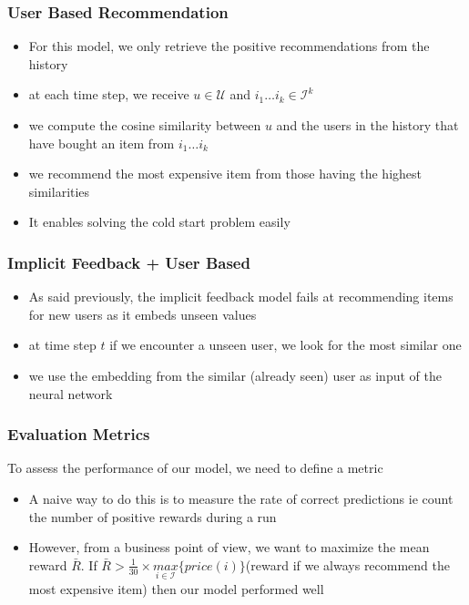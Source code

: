 \documentclass{beamer}
\begin{document}
\begin{frame}
	\frametitle{User Based Recommendation}
	\begin{itemize}
	\item For this model, we only retrieve the positive recommendations from the history
	\item at each time step, we receive $u\in \mathcal{U}$ and $i_1 \dots i_k \in \mathcal{I}^k$
	\item we compute the cosine similarity between $u$ and the users in the history that have bought an item from $i_1 \dots i_k$
	\item we recommend the most expensive item from those having the highest similarities
	\item It enables solving the cold start problem easily
	\end{itemize}
\end{frame}

\begin{frame}
	\frametitle{Implicit Feedback + User Based}
	\begin{itemize}
	\item As said previously, the implicit feedback model fails at recommending items for new users as it embeds unseen values
	\item at time step $t$ if we encounter a unseen user, we look for the most similar one
	\item we use the embedding from the similar (already seen) user as input of the neural network
	\end{itemize}
\end{frame}

\begin{frame}
	\frametitle{Evaluation Metrics}
	To assess the performance of our model, we need to define a metric
	\begin{itemize}
		\item A naive way to do this is to measure the rate of correct predictions ie count the number of positive rewards during a run
		\item However, from a business point of view, we want to maximize the mean reward $\bar{R}$. If 
		$\bar{R} > \frac{1}{30}\times \underset{i \in \mathcal{I}}{max}\lbrace price(i)\rbrace$(reward if we always recommend the most expensive item) then our model performed well 
	\end{itemize}
\end{frame}
\end{document}
